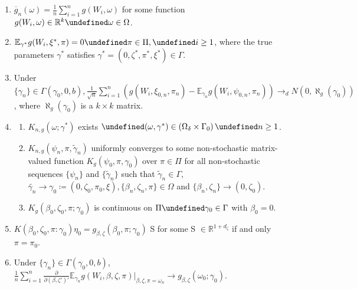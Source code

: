 \documentclass[11pt]{article}
\newcommand*{\R}{\mathbb{R}}
\newcommand*{\E}{\mathbb{E}}
\newcommand*{\N}{N}
\newcommand*{\dto}{\ensuremath{\rightarrow_d}}
\let\oldforall\forall
\let\forall\undefined
\DeclareMathOperator{\forall}{\oldforall}
\begin{document}
\begin{enumerate}
    \item $\overline{g}_n(\omega) = \frac{1}{n} \sum_{i=1}^n g(W_i, \omega)$  for some function $g(W_i, \omega)
        \in \R^k \forall \omega \in \Omega$.
    \item $\E_{\gamma^{*}} g(W_i, \xi^{*}, \pi) = 0 \forall \pi \in \Pi, \forall i \geq 1$, where the true
        parameters $\gamma^{*}$ satisfies $\gamma^{*} = (0,\zeta^{*}, \pi^{*}, \xi^{*}) \in \Gamma$.
    \item Under $\{ \gamma_n \} \in \Gamma(\gamma_0, 0, b), \frac{1}{\sqrt{n}} \sum_{i=1}^n \left(g(W_i, \xi_{0,n},
        \pi_n) - \E_{\gamma_n} g(W_i, \psi_{0,n}, \pi_n)\right) \dto \N\left(0, \aleph_g(\gamma_0)\right)$, where
        $\aleph_{g}(\gamma_0)$ is a $k \times k$ matrix.
    \item 
        \begin{enumerate}
            \item  $K_{n,g}(\omega ; \gamma^{*})$ exists $\forall (\omega, \gamma^{*}) \in \left(\Omega_{\delta}
                \times \Gamma_{0}\right) \forall n \geq 1$.
            \item $K_{n,g}(\psi_n, \pi, \tilde{\gamma}_n)$ uniformly converges to some non-stochastic matrix-valued
                function  $K_{g}(\psi_0, \pi, \gamma_0)$  over $\pi \in \Pi$ for all non-stochastic sequences $\{
                \psi_n \}$ and $\{ \tilde{\gamma}_n \}$ such that $\tilde{\gamma}_n \in \Gamma$, $\tilde{\gamma_n}
                \to \gamma_0 \coloneqq (0, \zeta_0, \pi_0, \xi), \{ \beta_n, \zeta_n, \pi \} \in \Omega$ and
                $\{\beta_n, \zeta_n \} \to (0, \zeta_0)$.
                \label{item:asymptotic_valid_cov}
            \item $K_g(\beta_0, \zeta_0, \pi ; \gamma_0)$ is continuous on $\Pi \forall \gamma_0 \in \Gamma$ with
                $\beta_0 = 0$.
        \end{enumerate}
        \item $K(\beta_0, \zeta_0, \pi: \gamma_0) \eta_0 = g_{\beta, \zeta}\left(\beta_0, \pi; \gamma_0\right)$ S
            for some S $\in \R^{1+d_{\zeta}}$ if and only $\pi = \pi_0$.
        \item Under $\{ \gamma_n \} \in \Gamma(\gamma_0, 0, b)$, $\frac{1}{n} \sum_{i=1}^n
            \frac{\partial}{\partial (\beta, \zeta')'}  \E_{\gamma_n} g\left(W_i, \beta, \zeta, \pi\right)
            \vert_{\beta, \zeta, \pi = \omega_n} \to g_{\beta, \zeta}(\omega_0 ; \gamma_0)$.
\end{enumerate}
\end{document}
